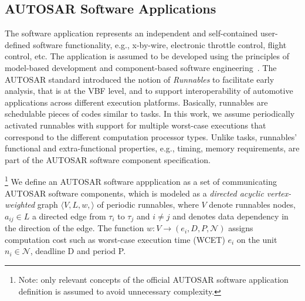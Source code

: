 \subsection{AUTOSAR Software Applications}
The software application represents an independent and self-contained user-defined software functionality, e.g., x-by-wire, electronic throttle control, flight control, etc. The application is assumed to be developed using the principles of model-based development and component-based software engineering~\cite{softwarecomponents}\cite{Crnkovic2002BuildingSystems}. The AUTOSAR standard introduced the notion of \textit{Runnables} to facilitate early analysis, that is at the VBF level, and to support interoperability of automotive applications across different execution platforms. Basically, runnables are schedulable pieces of codes similar to tasks. In this work, we assume periodically activated runnables with support for multiple worst-case executions that correspond to the different computation processor types. Unlike tasks, runnables' functional and extra-functional properties, e.g., timing, memory requirements, are part of the AUTOSAR software component specification.



\begin{definition}\footnote{ Note: only relevant concepts of the official AUTOSAR software application definition is assumed to avoid unnecessary complexity. }\label{def_application}
We define an AUTOSAR software appplication as a set of communicating AUTOSAR software components, which is modeled as a \textit{directed acyclic vertex-weighted} graph $\langle V, L, w, \rangle$ of periodic runnables, where $V$ denote runnables nodes, $a_{ij}\in L$ a directed edge from $\tau_i$ to $\tau_j$ and $i \neq j$ and denotes data dependency in the direction of the edge. The function $w: V\rightarrow (e_i,D,P, \mathcal{N})$ assigns computation cost such as worst-case execution time (WCET) $e_i$ on the unit $n_i\in \mathcal{N}$, deadline D and period P.
\end{definition}

